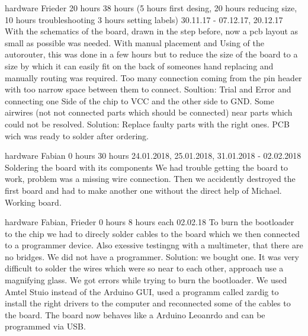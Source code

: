 	{hardware}%
	{Frieder}%
	{20 hours}%
	{38 hours (5 hours first desing, 20 hours reducing size, 10 hours troubleshooting 3 hours setting labels)}%
	{30.11.17 - 07.12.17, 20.12.17}%
	{With the schematics of the board, drawn in the step before, now a pcb layout as small as possible was needed. With manual placement and  Using of the autorouter, this was done in a few hours but to reduce the size of the board to a size by which it can easily fit on the back of someones hand replacing and manually routing was required.}%
	{Too many connection coming from the pin header with too narrow space between them to connect. Soultion: Trial and Error and connecting one Side of the chip to VCC and the other side to GND.  Some airwires (not not connected parts which should be connected) near parts which could not be resolved. Solution: Replace faulty parts with the right ones.}%
	{PCB wich was ready to solder after ordering.}%
	
	{hardware}%
	{Fabian}%
	{0 hours}%
	{30 hours}%
	{24.01.2018, 25.01.2018, 31.01.2018 - 02.02.2018}%
	{Soldering the board with its components}%
	{We had trouble getting the board to work, problem was a missing wire connection. Then we accidently destroyed the first board and had to make another one without the direct help of Michael.}%
	{Working board.}%
	
	{hardware}%
	{Fabian, Frieder}%
	{0 hours}%
	{8 hours each}%
	{02.02.18}%
	{To burn the bootloader to the chip we had to direcly solder cables to the board which we then connected to a programmer device. Also exessive testingng with a multimeter, that there are no bridges.}%
	{We did not have a programmer. Solution: we bought one. It was very difficult to solder the wires which were so near to each other, approach use a magnifying glass. We got errors while trying to burn the bootloader. We used Amtel Stuio instead of the Arduino GUI, used a programm called zardig to install the right drivers to the computer and reconnected some of the cables to the board.}%
	{The board now behaves like a Arduino Leoanrdo and can be programmed via USB.}%
	
